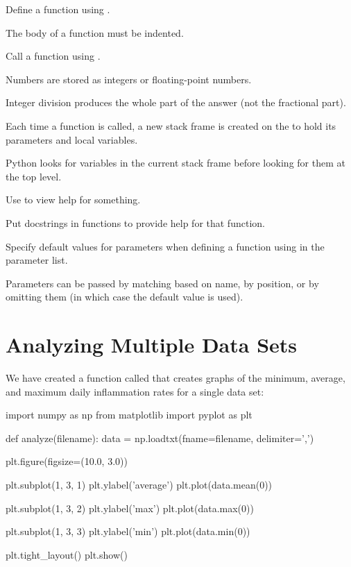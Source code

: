 \begin{keypoints}
\begin{swcitemize}
\item
  Define a function using .
\item
  The body of a function must be indented.
\item
  Call a function using .
\item
  Numbers are stored as integers or floating-point numbers.
\item
  Integer division produces the whole part of the answer (not the
  fractional part).
\item
  Each time a function is called, a new stack frame is created on the
   to hold its parameters and local
  variables.
\item
  Python looks for variables in the current stack frame before looking
  for them at the top level.
\item
  Use  to view help for something.
\item
  Put docstrings in functions to provide help for that function.
\item
  Specify default values for parameters when defining a function using
   in the parameter list.
\item
  Parameters can be passed by matching based on name, by position, or by
  omitting them (in which case the default value is used).
\end{swcitemize}
\end{keypoints}

\section{Analyzing Multiple Data Sets}

We have created a function called  that creates graphs
of the minimum, average, and maximum daily inflammation rates for a
single data set:

\begin{VerbIn}
import numpy as np
from matplotlib import pyplot as plt

def analyze(filename):
    data = np.loadtxt(fname=filename, delimiter=',')

    plt.figure(figsize=(10.0, 3.0))

    plt.subplot(1, 3, 1)
    plt.ylabel('average')
    plt.plot(data.mean(0))

    plt.subplot(1, 3, 2)
    plt.ylabel('max')
    plt.plot(data.max(0))

    plt.subplot(1, 3, 3)
    plt.ylabel('min')
    plt.plot(data.min(0))

    plt.tight_layout()
    plt.show()
\end{VerbIn}

